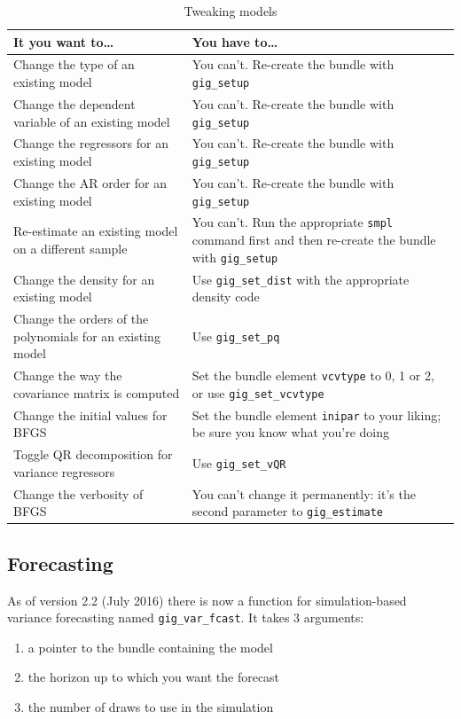 \documentclass[a4paper,11pt]{article}
\newcommand{\cmd}[1]{\texttt{#1}}
\begin{document}
\begin{table}[htbp]
  \centering
  \begin{tabular}{p{}p{}}
    \hline
    \hline
    \textbf{It you want to\ldots} &
    \textbf{You have to\ldots} \\
    \hline
    Change the type of an existing model &
    You can't. Re-create the bundle with \texttt{gig\_setup} \\
    Change the dependent variable of an existing model &
    You can't. Re-create the bundle with \texttt{gig\_setup} \\
    Change the regressors for an existing model &
    You can't. Re-create the bundle with \texttt{gig\_setup} \\
    Change the AR order for an existing model &
    You can't. Re-create the bundle with \texttt{gig\_setup} \\
    Re-estimate an existing model on a different sample &
    You can't. Run the appropriate \texttt{smpl} command first 
    and then re-create the bundle with \texttt{gig\_setup} \\
    Change the density for an existing model &
    Use \texttt{gig\_set\_dist} with the appropriate density code \\
    Change the orders of the polynomials for an existing model &
    Use \texttt{gig\_set\_pq} \\
    Change the way the covariance matrix is computed &
    Set the bundle element \texttt{vcvtype} to 0, 1 or 2, or use
    \texttt{gig\_set\_vcvtype} \\
    Change the initial values for BFGS &
    Set the bundle element \texttt{inipar} to your liking; be sure you
    know what you're doing \\
    Toggle QR decomposition for variance regressors &
    Use \texttt{gig\_set\_vQR} \\
    Change the verbosity of BFGS &
    You can't change it permanently: it's the second parameter to 
    \texttt{gig\_estimate} \\
    \hline
    \hline
  \end{tabular}
  \caption{Tweaking models}
  \label{tab:tweaks}
\end{table}

\subsection{Forecasting}
\label{sec:forecast}

As of version 2.2 (July 2016) there is now a function for
simulation-based variance
forecasting named \cmd{gig\_var\_fcast}. It takes 3 arguments:
\begin{enumerate}
\item a pointer to the bundle containing the model
\item the horizon up to which you want the forecast
\item the number of draws to use in the simulation
\end{enumerate}
\end{document}
